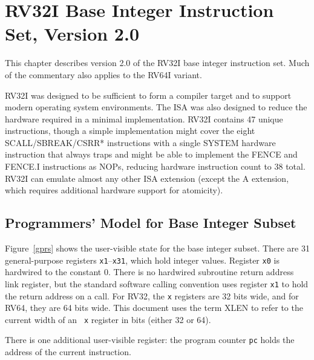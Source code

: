 \chapter{RV32I Base Integer Instruction Set, Version 2.0}
\label{rv32}

This chapter describes version 2.0 of the RV32I base integer
instruction set.  Much of the commentary also applies to the RV64I
variant.

\begin{commentary}
RV32I was designed to be sufficient to form a compiler target and to
support modern operating system environments.  The ISA was also
designed to reduce the hardware required in a minimal implementation.
RV32I contains 47 unique instructions, though a simple implementation
might cover the eight SCALL/SBREAK/CSRR* instructions with a single
SYSTEM hardware instruction that always traps and might be able to
implement the FENCE and FENCE.I instructions as NOPs, reducing
hardware instruction count to 38 total.  RV32I can emulate almost any
other ISA extension (except the A extension, which requires additional
hardware support for atomicity).
\end{commentary}

\section{Programmers' Model for Base Integer Subset}

Figure~\ref{gprs} shows the user-visible state for the base integer
subset.  There are 31 general-purpose registers {\tt x1}--{\tt x31},
which hold integer values.  Register {\tt x0} is hardwired to the
constant 0.  There is no hardwired subroutine return address link
register, but the standard software calling convention uses register
{\tt x1} to hold the return address on a call.  For RV32, the {\tt x}
registers are 32 bits wide, and for RV64, they are 64 bits wide.  This
document uses the term XLEN to refer to the current width of an {\tt
  x} register in bits (either 32 or 64).

There is one additional user-visible register: the program counter {\tt pc}
holds the address of the current instruction.

